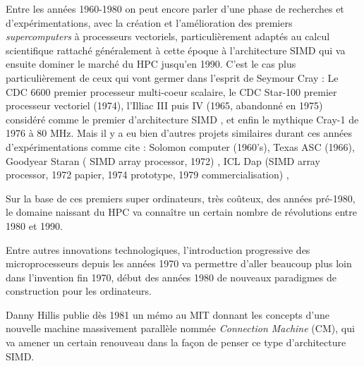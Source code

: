 Entre les années 1960-1980 on peut encore parler d'une phase de recherches et d'expérimentations, avec la création et l'amélioration des premiers \textit{supercomputers} à processeurs vectoriels, particulièrement adaptés au calcul scientifique rattaché généralement à cette époque à l'architecture SIMD  qui va ensuite dominer le marché du HPC jusqu'en 1990. C'est le cas plus particulièrement de ceux qui vont germer dans l'esprit de Seymour Cray : Le CDC 6600 premier processeur multi-coeur scalaire, le CDC Star-100 premier processeur vectoriel (1974), l'Illiac III puis IV (1965, abandonné en 1975) considéré comme le premier d'architecture SIMD \autocite{Muraoka2011}, et enfin le mythique Cray-1 de 1976 à  80 MHz. Mais il y a eu bien d'autres projets similaires durant ces années d'expérimentations comme cite \textcite[387-388]{Steele2011} : Solomon computer (1960's), Texas ASC (1966), Goodyear Staran ( SIMD array processor, 1972) , ICL Dap (SIMD array processor, 1972 papier, 1974 prototype, 1979 commercialisation) , %


Sur la base de ces premiers super ordinateurs, très coûteux, des années pré-1980, le domaine naissant du HPC va connaître un certain nombre de révolutions entre 1980 et 1990.

Entre autres innovations technologiques, l'introduction progressive des microprocesseurs depuis les années 1970 va permettre d'aller beaucoup plus loin dans l'invention fin 1970, début des années 1980 de nouveaux paradigmes de construction pour les ordinateurs. %

Danny Hillis publie dès 1981 un mémo au MIT donnant les concepts \autocite{Hillis1981} d'une nouvelle machine massivement parallèle nommée \textit{Connection Machine} (CM), qui va amener un certain renouveau dans la façon de penser ce type d'architecture SIMD.

